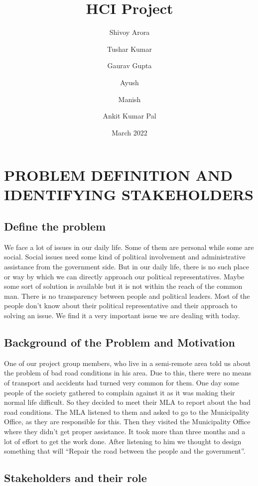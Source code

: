 \documentclass[acmtog]{acmart}
\title{HCI Project}
\author{Shivoy Arora}
\author{Tushar Kumar}
\author{Gaurav Gupta}
\author{Ayush}
\author{Manish}
\author{Ankit Kumar Pal}
\date{March 2022}
\begin{document}
\maketitle

\section{PROBLEM DEFINITION AND IDENTIFYING STAKEHOLDERS}

\subsection{Define the problem}
We face a lot of issues in our daily life. Some of them are personal while some are social. Social issues need some kind of political involvement and administrative assistance from the government side. But in our daily life, there is no such place or way by which we can directly approach our political representatives. Maybe some sort of solution is available but it is not within the reach of the common man. There is no transparency between people and political leaders. Most of the people don’t know about their political representative and their approach to solving an issue. We find it a very important issue we are dealing with today.

\subsection{Background of the Problem and Motivation}
One of our project group members, who live in a semi-remote area told us about the problem of bad road conditions in his area. Due to this, there were no means of transport and accidents had turned very common for them. One day some people of the society gathered to complain against it as it was making their normal life difficult. So they decided to meet their MLA to report about the bad road conditions. The MLA listened to them and asked to go to the Municipality Office, as they are responsible for this. Then they visited the Municipality Office where they didn’t get proper assistance. It took more than three months and a lot of effort to get the work done. After listening to him we thought to design something that will “Repair the road between the people and the government”.

\subsection{Stakeholders and their role}
\end{document}
